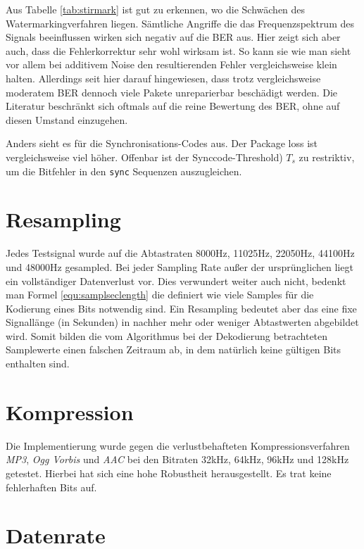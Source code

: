 Aus Tabelle \ref{tab:stirmark} ist gut zu erkennen, wo die Schwächen des Watermarkingverfahren liegen. Sämtliche Angriffe die das Frequenzspektrum des Signals beeinflussen wirken sich negativ auf die BER aus. Hier zeigt sich aber auch, dass die Fehlerkorrektur sehr wohl wirksam ist. So kann sie wie man sieht vor allem bei additivem Noise den resultierenden Fehler vergleichsweise klein halten. 
Allerdings seit hier darauf hingewiesen, dass trotz vergleichsweise moderatem BER dennoch viele Pakete unreparierbar beschädigt werden. Die Literatur beschränkt sich oftmals auf die reine Bewertung des BER, ohne auf diesen Umstand einzugehen. 

Anders sieht es für die Synchronisations-Codes aus. Der Package loss ist vergleichsweise viel höher. Offenbar ist der Synccode-Threshold) ${T}_{s}$ zu restriktiv, um die Bitfehler in den \texttt{sync} Sequenzen auszugleichen.

\section{Resampling}

Jedes Testsignal wurde auf die Abtastraten 8000Hz, 11025Hz, 22050Hz, 44100Hz und 48000Hz gesampled. Bei jeder Sampling Rate außer der ursprünglichen liegt ein vollständiger Datenverlust vor. Dies verwundert weiter auch nicht, bedenkt man Formel \ref{equ:samplseclength} die definiert wie viele Samples für die Kodierung eines Bits notwendig sind. Ein Resampling bedeutet aber das eine fixe Signallänge (in Sekunden) in nachher mehr oder weniger Abtastwerten abgebildet wird. Somit bilden die vom Algorithmus bei der Dekodierung betrachteten Samplewerte einen falschen Zeitraum ab, in dem natürlich keine gültigen Bits enthalten sind. 

\section{Kompression}

Die Implementierung wurde gegen die verlustbehafteten Kompressionsverfahren \textit{MP3}, \textit{Ogg Vorbis} und \textit{AAC} bei den Bitraten 32kHz, 64kHz, 96kHz und 128kHz getestet. Hierbei hat sich eine hohe Robustheit herausgestellt. Es trat keine fehlerhaften Bits auf.  

\section{Datenrate}
\label{sec:datenrate}

